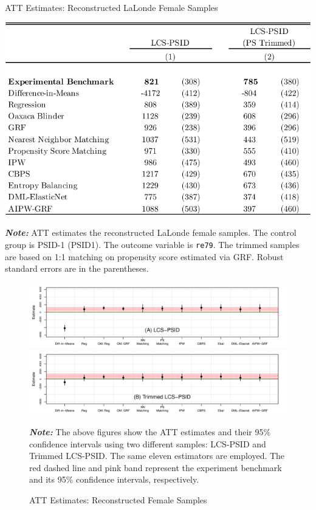 \documentclass[letterpaper,12pt,leqno]{article}
\begin{document}
\begin{table}[!ht]
\caption{ATT Estimates: Reconstructed LaLonde Female Samples}\label{tb:lcs.est}
\begin{minipage}[c]{1\textwidth}
\begin{center}
\vspace{-0.5em}\includegraphics[width=0.6\linewidth]{lcs.pdf}
\end{center}\vspace{-1em}
{\footnotesize\textbf{\textit{Note:}} ATT estimates the reconstructed LaLonde female samples. The control group is PSID-1 (PSID1). The outcome variable is \texttt{re79}. The trimmed samples are based on 1:1 matching on propensity score estimated via GRF. Robust standard errors are in the parentheses.}
\end{minipage}%
\end{table}

\begin{figure}[!ht]
    \caption{ATT Estimates: Reconstructed Female Samples}\label{fig:lcs.att}
    \vspace{-1em}
    \begin{minipage}[c]{1\textwidth}
    \begin{center}
    \includegraphics[width=0.8\linewidth]{coef_lcs_psid.pdf}
    \includegraphics[width=0.8\linewidth]{coef_lcs_psid_trim.pdf}
    \end{center}    
     {\footnotesize\textbf{\textit{Note:}} The above figures show the ATT estimates and their 95\% confidence intervals using two different samples: LCS-PSID and Trimmed LCS-PSID. The same eleven estimators are employed. The red dashed line and pink band represent the experiment benchmark and its 95\% confidence intervals, respectively.}
     \end{minipage}
\end{figure}
\end{document}
